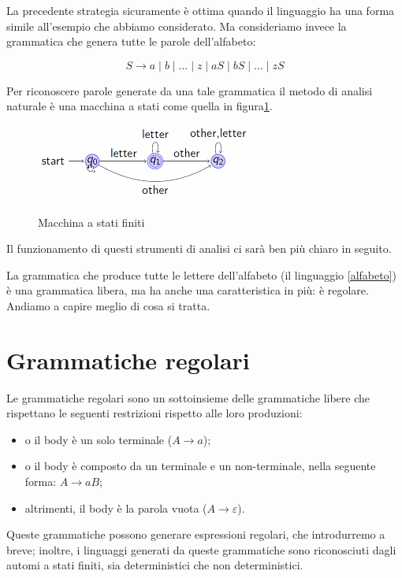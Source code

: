 \documentclass[class=book, crop=false, oneside, 12pt]{standalone}
\begin{document}
La precedente strategia sicuramente è ottima quando il linguaggio ha una forma simile all'esempio che abbiamo considerato. Ma consideriamo invece la grammatica che genera tutte le parole dell’alfabeto:

\begin{equation}
    \label{alfabeto}
    S \to a \mid b \mid … \mid z \mid aS \mid bS \mid … \mid zS
\end{equation}

Per riconoscere parole generate da una tale grammatica il metodo di analisi naturale è una macchina a stati come quella in figura\ref{macchina_a_stati_finiti}.

\begin{figure}
    \centering
    \includegraphics[width=.5\textwidth,keepaspectratio]{macchina_a_stati_finiti}
    \label{macchina_a_stati_finiti}
    \caption{Macchina a stati finiti}
\end{figure}

\noindent Il funzionamento di questi strumenti di analisi ci sarà ben più chiaro in seguito.

La grammatica che produce tutte le lettere dell’alfabeto (il linguaggio \ref{alfabeto}) è una grammatica libera, ma ha anche una caratteristica in più: è regolare. Andiamo a capire meglio di cosa si tratta.


\section{Grammatiche regolari}

Le grammatiche regolari sono un sottoinsieme delle grammatiche libere che rispettano le seguenti restrizioni rispetto alle loro produzioni:

\begin{itemize}
    \item o il body è un solo terminale (\(A \to a\));
    \item o il body è composto da un terminale e un non-terminale, nella seguente forma: \(A \to aB\);  
    \item altrimenti, il body è la parola vuota (\(A \to \varepsilon\)).
\end{itemize}

Queste grammatiche possono generare espressioni regolari, che introdurremo a breve; inoltre, i linguaggi generati da queste grammatiche sono riconosciuti dagli automi a stati finiti, sia deterministici che non deterministici.
\end{document}

